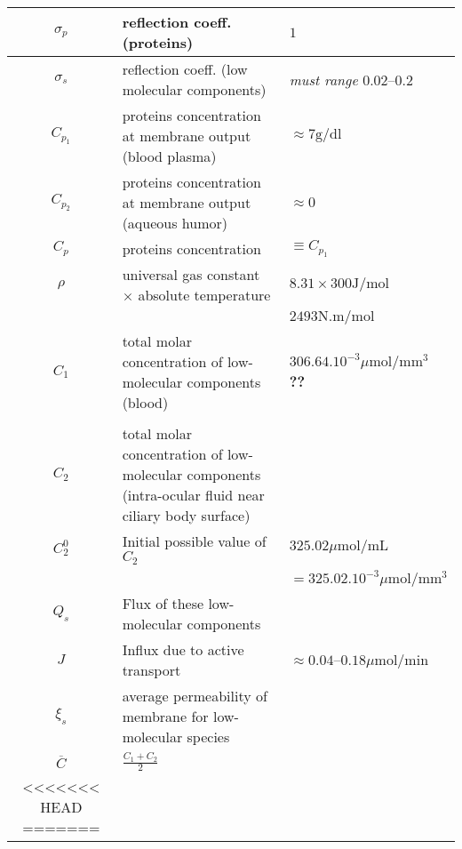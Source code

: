 \documentclass[11pt]{article}
\begin{document}
\begin{center}
\begin{tabular}{|c|p{}|l|}
 \hline
 $\sigma_p$ &reflection coeff. (proteins) & $1$ \\
 \hline
 $\sigma_s$ & reflection coeff. (low molecular components) & \textit{must range} $0.02$--$0.2$ \\
 \hline
$ C_{p_1}$& proteins concentration at membrane output (blood plasma) & $\approx 7 \mathrm{g}/\mathrm{dl}$ \\
\hline
$C_{p_2}$ & proteins concentration at membrane output (aqueous humor) &$\approx 0$ \\
\hline
$C_p$ & proteins concentration & $\equiv C_{p_1}$ \\
\hline
$\rho$ & universal gas constant $\times$  absolute temperature &$8.31 \times 300 \mathrm{J}/\mathrm{mol} $\\
&& $2493 \mathrm{N}.\mathrm{m}/\mathrm{mol}$\\
\hline
$C_1$& total molar concentration of low-molecular components (blood) & $306.64.10^{-3} \mu \mathrm{mol}/\mathrm{mm}^3$ \textbf{??}\cite{to2002mechanism}\\\\
\hline
$C_2$& total molar concentration of low-molecular components (intra-ocular fluid near ciliary body surface) & \\
\hline
$C_2^0$&Initial possible value of $C_2$&$325.02 \mu \mathrm{mol}/\mathrm{mL}$ \\
& & $ = 325.02.10^{-3}	 \mu \mathrm{mol}/\mathrm{mm^3}$
\cite{to2002mechanism}\\
\hline
$Q_s$ & Flux of these low-molecular components & \\
\hline
$J$ & Influx due to active transport & $\approx 0.04$--$0.18 \mu \mathrm{mol} / \mathrm{min}$\\
\hline
$\xi_s$ & average permeability of membrane for low-molecular species& \\
\hline
$\overline{C}$& $\displaystyle{\frac{C_1+C_2}{2}}$& \\
\hline
<<<<<<< HEAD
=======
\end{tabular}
\end{center}
\end{document}
